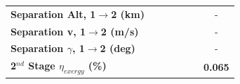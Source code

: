 \begin{table}[ht!]
\begin{tabular}{l c c c c c c}
		\textbf{Separation Alt, 1$\rightarrow$2 (km)}
		& \firstsecondSeparationAltIspNinetyNoReturn
		& \firstsecondSeparationAltIspNinetyFiveNoReturn
		& \firstsecondSeparationAltIspStandardNoReturn
		& \firstsecondSeparationAltIspOneHundredFiveNoReturn
		& \firstsecondSeparationAltIspOneHundredTenNoReturn
		& -
		\\
		\textbf{Separation v, 1$\rightarrow$2 (m/s)}
		& \firstsecondSeparationvIspNinetyNoReturn
		& \firstsecondSeparationvIspNinetyFiveNoReturn
		& \firstsecondSeparationvIspStandardNoReturn
		& \firstsecondSeparationvIspOneHundredFiveNoReturn
		& \firstsecondSeparationvIspOneHundredTenNoReturn
		& -
		\\
		\textbf{Separation $\gamma$, 1$\rightarrow$2 (deg)}
		& \firstsecondSeparationgammaIspNinetyNoReturn
		& \firstsecondSeparationgammaIspNinetyFiveNoReturn
		& \firstsecondSeparationgammaIspStandardNoReturn
		& \firstsecondSeparationgammaIspOneHundredFiveNoReturn
		& \firstsecondSeparationgammaIspOneHundredTenNoReturn
		& -
		\\
		\hline 
		\textbf{2$^{nd}$ Stage $\eta_{exergy}$ (\%)}
		& \textbf{\secondExergyEffIspNinetyNoReturn}
		& \textbf{\secondExergyEffIspNinetyFiveNoReturn}
		& \textbf{\secondExergyEffIspStandardNoReturn}
		& \textbf{\secondExergyEffIspOneHundredFiveNoReturn}
		& \textbf{\secondExergyEffIspOneHundredTenNoReturn}
		& \textbf{0.065}
		\\
	

\end{tabular}
\end{table}
